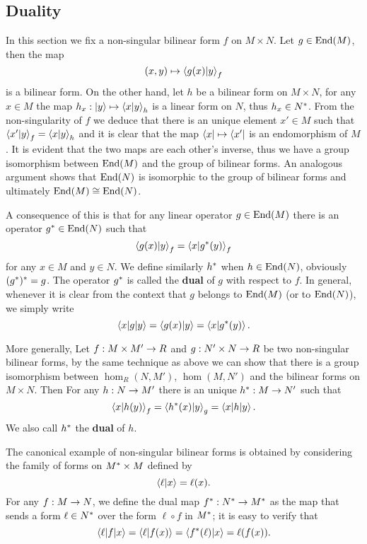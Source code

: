 \subsection{Duality}
\label{sec:linear-algebra:duality}
In this section we fix a non-singular bilinear form $f$ on $M\times
N$. Let $g\in\operatorname{End}(M)$, then the map
\[(x,y) \mapsto \left\langle g(x) \middle| y \right\rangle_f\] is a bilinear
form. On the other hand, let $h$ be a bilinear form on $M\times N$,
for any $x\in M$ the map $h_x : \left\lvert y \right\rangle \mapsto \left\langle x \middle| y \right\rangle_h$
is a linear form on $N$, thus $h_x\in N^\ast$. From the
non-singularity of $f$ we deduce that there is an unique element
$x'\in M$ such that $\left\langle x' \middle| y \right\rangle_f=\left\langle x \middle| y \right\rangle_h$ and it is
clear that the map $\left\langle x \right\rvert\mapsto \left\langle x' \right\rvert$ is an endomorphism of
$M$. It is evident that the two maps are each other's inverse, thus we
have a group isomorphism between $\operatorname{End}(M)$ and the group of bilinear
forms. An analogous argument shows that $\operatorname{End}(N)$ is isomorphic to the
group of bilinear forms and ultimately $\operatorname{End}(M)\cong\operatorname{End}(N)$.

A consequence of this is that for any linear operator $g\in\operatorname{End}(M)$
there is an operator $g^\ast\in\operatorname{End}(N)$ such that
\[\left\langle g(x) \middle| y \right\rangle_f = \left\langle x \middle| g^\ast(y) \right\rangle_f\]
for any $x\in M$ and $y\in N$. We define similarly $h^\ast$ when
$h\in\operatorname{End}(N)$, obviously $(g^\ast)^\ast = g$. The operator
$g^\ast$ is called the \textbf{dual} of $g$
with respect to $f$. In general, whenever it is clear from the context
that $g$ belongs to $\operatorname{End}(M)$ (or to $\operatorname{End}(N)$), we simply write
\[\left\langle x \middle| g \middle| y \right\rangle = \left\langle g(x) \middle| y \right\rangle = \left\langle x \middle| g^\ast(y) \right\rangle\text{.}\]

More generally, Let $f:M\times M'\rightarrow R$ and $g:N'\times N\rightarrow R$ be two
non-singular bilinear forms, by the same technique as above we can
show that there is a group isomorphism between $\hom_R(N,M')$,
$\hom(M,N')$ and the bilinear forms on $M\times N$. Then For any
$h:N\rightarrow M'$ there is an unique $h^\ast:M\rightarrow N'$ such that
\[\left\langle x \middle| h(y) \right\rangle_f = \left\langle h^\ast(x) \middle| y \right\rangle_g =
\left\langle x \middle| h \middle| y \right\rangle\text{.}\]
We also call $h^\ast$ the \textbf{dual} of $h$.

The canonical example of non-singular bilinear forms is obtained by
considering the family of forms on $M^\ast\times M$ defined by
\[\left\langle \ell \middle| x \right\rangle = \ell(x) \text{.}\]
For any $f:M\rightarrow N$, we define the dual map
$f^\ast:N^\ast\rightarrow M^\ast$ as the map that sends a form
$\ell\in N^\ast$ over the form $\ell\circ f$ in $M^\ast$; it is
easy to verify that
\[\left\langle \ell \middle| f \middle| x \right\rangle =  \left\langle \ell \middle| f(x) \right\rangle = \left\langle f^\ast(\ell) \middle| x \right\rangle
= \ell(f(x))\text{.}\]

